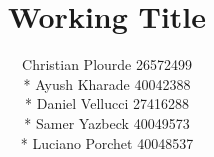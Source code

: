 \documentclass{article}
\begin{document}
\title{Working Title}
\author{Christian Plourde 26572499\\*
		Ayush Kharade 40042388\\*
		Daniel Vellucci 27416288\\*
		Samer Yazbeck 40049573\\*
		Luciano Porchet 40048537
		}

\maketitle
\end{document}
